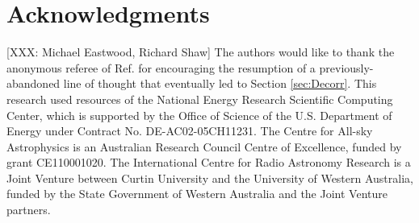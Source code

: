 \documentclass[twocolumn,aps,prd,nofootinbib,showpacs]{revtex4-1}
\begin{document}
\section*{Acknowledgments}
[XXX: Michael Eastwood, Richard Shaw]
The authors would like to thank the anonymous referee of Ref. \cite{Dillon2014} for encouraging the resumption of a previously-abandoned line of thought that eventually led to Section \ref{sec:Decorr}.  
This research used resources of the National Energy Research
Scientific Computing Center, which is supported by the Office of
Science of the U.S. Department of Energy under Contract No. 
DE-AC02-05CH11231.  The Centre for All-sky Astrophysics is an Australian Research Council Centre of Excellence, funded by grant CE110001020. The International Centre for Radio Astronomy Research is a Joint Venture between Curtin University and the University of Western Australia, funded by the State Government of Western Australia and the Joint Venture partners.



\end{document}
